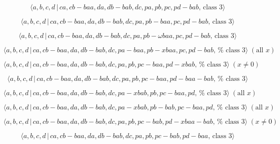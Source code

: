\documentclass[10pt]{article}
\begin{document}
\begin{equation}
\langle a,b,c,d\,|\,ca,cb-baa,da,db-bab,dc,pa,pb,pc,pd-bab,\,\text{class }%
3\rangle  \tag{7.3414}
\end{equation}

\begin{equation}
\langle a,b,c,d\,|\,ca,cb-baa,da,db-bab,dc,pa,pb-baa,pc,pd-bab,\,\text{class 
}3\rangle  \tag{7.3415}
\end{equation}

\begin{equation}
\langle a,b,c,d\,|\,ca,cb-baa,da,db-bab,dc,pa,pb-\omega baa,pc,pd-bab,\,%
\text{class }3\rangle  \tag{7.3416}
\end{equation}

\begin{equation}
\langle a,b,c,d\,|\,ca,cb-baa,da,db-bab,dc,pa-baa,pb-xbaa,pc,pd-bab,\,\text{%
class }3\rangle \;(\text{all }x)  \tag{7.3417}
\end{equation}

\begin{equation}
\langle a,b,c,d\,|\,ca,cb-baa,da,db-bab,dc,pa,pb,pc-baa,pd-xbab,\,\text{%
class }3\rangle \;(x \neq 0)  \tag{7.3418}
\end{equation}

\begin{equation}
\langle a,b,c,d\,|\,ca,cb-baa,da,db-bab,dc,pa,pb,pc-baa,pd-baa-bab,\,\text{%
class }3\rangle  \tag{7.3419}
\end{equation}

\begin{equation}
\langle a,b,c,d\,|\,ca,cb-baa,da,db-bab,dc,pa-xbab,pb,pc-baa,pd,\,\text{%
class }3\rangle \;(\text{all }x)  \tag{7.3420}
\end{equation}

\begin{equation}
\langle a,b,c,d\,|\,ca,cb-baa,da,db-bab,dc,pa-xbab,pb-bab,pc-baa,pd,\,\text{%
class }3\rangle \;(\text{all }x)  \tag{7.3421}
\end{equation}

\begin{equation}
\langle a,b,c,d\,|\,ca,cb-baa,da,db-bab,dc,pa,pb,pc-bab,pd-xbaa-bab,\,\text{%
class }3\rangle \;(x \neq 0)  \tag{7.3422}
\end{equation}

\begin{equation}
\langle a,b,c,d\,|\,ca,cb-baa,da,db-bab,dc,pa,pb,pc-bab,pd-baa,\,\text{class 
}3\rangle  \tag{7.3423}
\end{equation}
\end{document}
